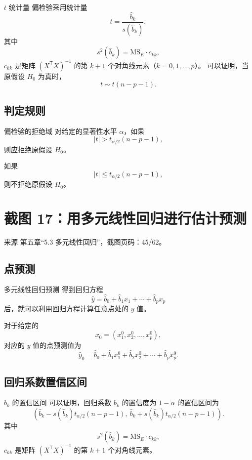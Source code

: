 \documentclass[UTF8,zihao=-4,fontset=fandol]{ctexart}
\begin{document}
\begin{keybox}{$t$ 统计量}
偏检验采用统计量
\[
t=\frac{\hat{b}_k}{s(\hat{b}_k)},
\]
其中
\[
s^2(\hat{b}_k)=\mathrm{MS}_E\cdot c_{kk},
\]
$c_{kk}$ 是矩阵 $(X^{\mathsf T}X)^{-1}$ 的第 $k+1$ 个对角线元素（$k=0,1,\ldots,p$）。
可以证明，当原假设 $H_0$ 为真时，
\[
t\sim t(n-p-1).
\]
\end{keybox}

\subsection{判定规则}

\begin{methodbox}{偏检验的拒绝域}
对给定的显著性水平 $\alpha$，如果
\[
|t|>t_{\alpha/2}(n-p-1),
\]
则应拒绝原假设 $H_0$。

如果
\[
|t|\le t_{\alpha/2}(n-p-1),
\]
则不拒绝原假设 $H_0$。
\end{methodbox}

\section{截图 17：用多元线性回归进行估计预测}

\begin{sourcebox}{来源}
第五章“5.3 多元线性回归”，截图页码：45/62。
\end{sourcebox}

\subsection{点预测}

\begin{keybox}{多元线性回归预测}
得到回归方程
\[
\hat{y}=\hat{b}_0+\hat{b}_1x_1+\cdots+\hat{b}_px_p
\]
后，就可以利用回归方程计算任意点处的 $y$ 值。

对于给定的
\[
x_0=(x_1^0,x_2^0,\ldots,x_p^0),
\]
对应的 $y$ 值的点预测值为
\[
\hat{y}_0
=
\hat{b}_0+\hat{b}_1x_1^0+\hat{b}_2x_2^0+\cdots+\hat{b}_px_p^0.
\]
\end{keybox}

\subsection{回归系数置信区间}

\begin{keybox}{$b_k$ 的置信区间}
可以证明，回归系数 $b_k$ 的置信度为 $1-\alpha$ 的置信区间为
\[
\left(
\hat{b}_k-s(\hat{b}_k)t_{\alpha/2}(n-p-1),\
\hat{b}_k+s(\hat{b}_k)t_{\alpha/2}(n-p-1)
\right).
\]
其中
\[
s^2(\hat{b}_k)=\mathrm{MS}_E\cdot c_{kk},
\]
$c_{kk}$ 是矩阵 $(X^{\mathsf T}X)^{-1}$ 的第 $k+1$ 个对角线元素。
\end{keybox}
\end{document}
